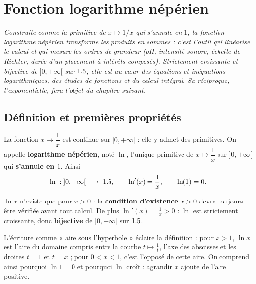 \chapter{Fonction logarithme népérien}

\noindent\textit{Construite comme la primitive de $x\mapsto 1/x$ qui s'annule en $1$, la
fonction logarithme népérien transforme les produits en sommes : c'est l'outil qui
linéarise le calcul et qui mesure les ordres de grandeur (pH, intensité sonore, échelle
de Richter, durée d'un placement à intérêts composés). Strictement croissante et
bijective de $]0,+\infty[$ sur $1.5$, elle est au cœur des équations et inéquations
logarithmiques, des études de fonctions et du calcul intégral. Sa réciproque,
l'exponentielle, fera l'objet du chapitre suivant.}
\vspace{8pt}

\section{Définition et premières propriétés}

\begin{definition}
La fonction $x\mapsto\dfrac1x$ est continue sur $]0,+\infty[$ : elle y admet des
primitives. On appelle \textbf{logarithme népérien}, noté $\ln$, l'unique primitive de
$x\mapsto\dfrac1x$ sur $]0,+\infty[$ qui \textbf{s'annule en $1$}. Ainsi
\[
\ln\;:\;]0,+\infty[\;\longrightarrow\;1.5,\qquad \ln'(x)=\frac1x,\qquad \ln(1)=0.
\]
\end{definition}

\begin{remarque}
$\ln x$ n'existe que pour $x>0$ : la \textbf{condition d'existence} $x>0$ devra toujours
être vérifiée avant tout calcul. De plus $\ln'(x)=\frac1x>0$ : $\ln$ est strictement
croissante, donc \textbf{bijective} de $]0,+\infty[$ sur $1.5$.
\end{remarque}

\begin{remarque}
L'écriture comme « aire sous l'hyperbole » éclaire la définition : pour $x>1$, $\ln x$ est
l'aire du domaine compris entre la courbe $t\mapsto\frac1t$, l'axe des abscisses et les
droites $t=1$ et $t=x$ ; pour $0<x<1$, c'est l'opposé de cette aire. On comprend ainsi
pourquoi $\ln 1=0$ et pourquoi $\ln$ croît : agrandir $x$ ajoute de l'aire positive.
\end{remarque}

